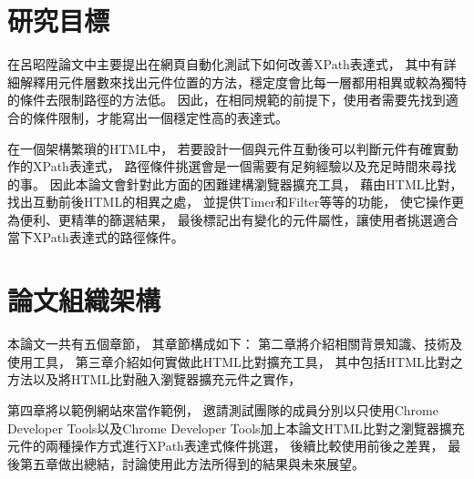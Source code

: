 \section{研究目標}\label{s1.2}
\indent
在呂昭陞論文\cite{LIU-Thesis}中主要提出在網頁自動化測試下如何改善XPath表達式，
其中有詳細解釋用元件層數來找出元件位置的方法，穩定度會比每一層都用相異或較為獨特的條件去限制路徑的方法低。
因此，在相同規範的前提下，使用者需要先找到適合的條件限制，才能寫出一個穩定性高的表達式。

在一個架構繁瑣的HTML中，
若要設計一個與元件互動後可以判斷元件有確實動作的XPath表達式，
路徑條件挑選會是一個需要有足夠經驗以及充足時間來尋找的事。
因此本論文會針對此方面的困難建構瀏覽器擴充工具，
藉由HTML比對，找出互動前後HTML的相異之處，
並提供Timer和Filter等等的功能，
使它操作更為便利、更精準的篩選結果，
最後標記出有變化的元件屬性，讓使用者挑選適合當下XPath表達式的路徑條件。

\section{論文組織架構}\label{s1.3}
\indent
本論文一共有五個章節，
其章節構成如下：
第二章將介紹相關背景知識、技術及使用工具，
第三章介紹如何實做此HTML比對擴充工具，
其中包括HTML比對之方法以及將HTML比對融入瀏覽器擴充元件之實作，

第四章將以範例網站來當作範例，
邀請測試團隊的成員分別以只使用Chrome Developer Tools以及Chrome Developer Tools加上本論文HTML比對之瀏覽器擴充元件的兩種操作方式進行XPath表達式條件挑選，
後續比較使用前後之差異，
最後第五章做出總結，討論使用此方法所得到的結果與未來展望。